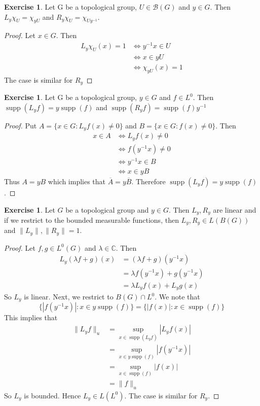 \documentclass[12pt]{amsart}
\theoremstyle{definition}
\newtheorem{ex}[definition]{Exercise}
\DeclareMathOperator{\supp}{supp}
\newcommand{\lam}{\lambda}
\newcommand{\C}{\mathbb{C}}
\newcommand{\MB}{\mathcal{B}}
\begin{document}
	\begin{ex}
		Let G be a topological group, $U \in \MB(G)$ and $y \in G$. Then $L_y\chi_U = \chi_{yU}$ and $R_y\chi_U = \chi_{Uy^{-1}}$. 
	\end{ex}
	
	\begin{proof}
		Let $x \in G$. Then 
		\begin{align*}
			L_y\chi_U(x) = 1
			& \iff y^{-1}x \in U\\
			& \iff x \in yU \\
			& \iff \chi_{yU}(x) = 1
		\end{align*}
		The case is similar for $R_y$
	\end{proof}
	
	\begin{ex}
		Let G be a topological group, $y \in G$ and $f \in L^0$. Then $\supp(L_yf) = y\supp(f)$ and $\supp(R_yf) = \supp(f)y^{-1}$
	\end{ex}
	
	\begin{proof}
		Put $A = \{x \in G: L_yf(x) \neq 0 \}$ and $B = \{x \in G: f(x) \neq 0 \}$. Then 
		\begin{align*}
			x \in A
			& \iff L_yf(x) \neq 0 \\
			& \iff f(y^{-1}x) \neq 0 \\
			& \iff y^{-1}x \in B \\
			& \iff x \in yB
		\end{align*}
		Thus $A = yB$ which implies that $\overline{A} = y\overline{B}$. Therefore $\supp(L_yf) = y\supp(f)$.
	\end{proof}
	
	\begin{ex}
		Let $G$ be a topological group and $y \in G$. Then $L_y, R_y$ are linear and if we restrict to the bounded measurable functions, then  $L_y, R_y \in L(B(G))$ and $\|L_y\|, \|R_y\| = 1$. 
	\end{ex}
	
	\begin{proof}
		Let $f, g \in L^0(G)$ and $\lam \in \C$. Then 
		\begin{align*}
			L_y(\lam f+g)(x)
			& = (\lam f+g)(y^{-1}x) \\
			& = \lam f(y^{-1}x) + g(y^{-1}x) \\
			& = \lam L_yf(x) + L_yg(x)
		\end{align*}
		So $L_y$ is linear. Next, we restrict to $B(G) \cap L^0$. We note that $$\{|f(y^{-1}x)|: x \in y\supp(f)\} = \{|f(x)|: x \in \supp(f)\}$$ This implies that 
		\begin{align*}
			\|L_yf \|_u 
			& = \sup_{x \in \supp(L_yf)} |L_yf(x)| \\
			& = \sup_{x \in y\supp(f)} |f(y^{-1}x)| \\
			& = \sup_{x \in \supp(f)} |f(x)| \\ 
			& = \|f\|_u
		\end{align*} 
		So $L_y$ is bounded. Hence $L_y \in L(L^0)$. The case is similar for $R_y$.
	\end{proof}
	
\end{document}

